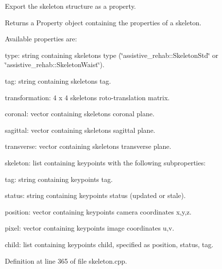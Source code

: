 Export the skeleton structure as a property. 

\begin{DoxyReturn}{Returns}
a Property object containing the properties of a skeleton.
\end{DoxyReturn}
Available properties are\+:
\begin{DoxyItemize}
\item type\+: string containing skeleton\textquotesingle{}s type (\char`\"{}assistive\+\_\+rehab\+::\+Skeleton\+Std\char`\"{} or \char`\"{}assistive\+\_\+rehab\+::\+Skeleton\+Waist\char`\"{}).
\item tag\+: string containing skeleton\textquotesingle{}s tag.
\item transformation\+: 4 x 4 skeleton\textquotesingle{}s roto-\/translation matrix.
\item coronal\+: vector containing skeleton\textquotesingle{}s coronal plane.
\item sagittal\+: vector containing skeleton\textquotesingle{}s sagittal plane.
\item transverse\+: vector containing skeleton\textquotesingle{}s transverse plane.
\item skeleton\+: list containing keypoints with the following subproperties\+:
\begin{DoxyItemize}
\item tag\+: string containing keypoint\textquotesingle{}s tag.
\item status\+: string containing keypoint\textquotesingle{}s status (updated or stale).
\item position\+: vector containing keypoint\textquotesingle{}s camera coordinates x,y,z.
\item pixel\+: vector containing keypoint\textquotesingle{}s image coordinates u,v.
\item child\+: list containing keypoint\textquotesingle{}s child, specified as position, status, tag. 
\end{DoxyItemize}
\end{DoxyItemize}

Definition at line 365 of file skeleton.\+cpp.


